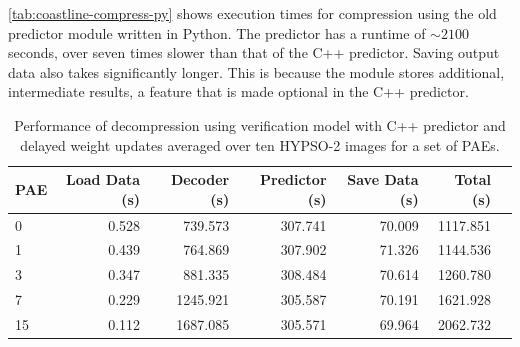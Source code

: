 \autoref{tab:coastline-compress-py} shows execution times for compression using the old predictor module written in Python. The predictor has a runtime of $\sim2100$ seconds, over seven times slower than that of the C++ predictor. Saving output data also takes significantly longer. This is because the module stores additional, intermediate results, a feature that is made optional in the C++ predictor.

\begin{table}[ht]
	\caption{Performance of decompression using verification model with C++ predictor and delayed weight updates averaged over ten HYPSO-2 images for a set of PAEs.}
	\label{tab:coastline-decompress}
	\begin{center}
		\begin{tabular}{lrrrrrr}
			\hline
			\textbf{PAE} & \textbf{Load Data (s)} & \textbf{Decoder (s)} & \textbf{Predictor (s)} & \textbf{Save Data (s)} & \textbf{Total (s)} \\
			\hline
			0            & 0.528                  & 739.573              & 307.741                & 70.009                 & 1117.851           \\
			1            & 0.439                  & 764.869              & 307.902                & 71.326                 & 1144.536           \\
			3            & 0.347                  & 881.335              & 308.484                & 70.614                 & 1260.780           \\
			7            & 0.229                  & 1245.921             & 305.587                & 70.191                 & 1621.928           \\
			15           & 0.112                  & 1687.085             & 305.571                & 69.964                 & 2062.732           \\
			\hline
		\end{tabular}
	\end{center}
\end{table}

